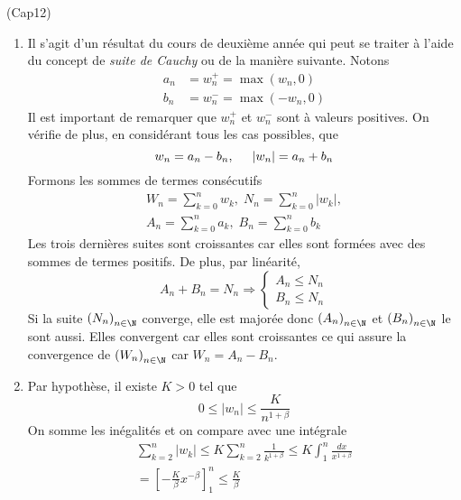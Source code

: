 \begin{tiny}(Cap12)\end{tiny}
\begin{enumerate}
 \item Il s'agit d'un résultat du cours de deuxième année qui peut se traiter à l'aide du concept de \emph{suite de Cauchy} ou de la manière suivante.\newline
Notons 
\begin{align*}
a_n &=w_n^+=\max(w_n,0) \\ b_n &=w_n^-=\max(-w_n,0) 
\end{align*}
Il est important de remarquer que $w_n^+$ et $w_n^-$ sont à valeurs positives. On vérifie de plus, en considérant tous les cas possibles, que 
\begin{displaymath}
 w_n = a_n - b_n,\hspace{0.5cm} |w_n| = a_n + b_n
\end{displaymath}
Formons les sommes de termes consécutifs
\begin{multline*}
 W_n = \sum_{k=0}^nw_k, \; N_n = \sum_{k=0}^n|w_k|, \\ A_n = \sum_{k=0}^na_k, \;B_n = \sum_{k=0}^nb_k
\end{multline*}
Les trois dernières suites sont croissantes car elles sont formées avec des sommes de termes positifs. De plus, par linéarité,
\begin{displaymath}
 A_n + B_n = N_n \Rightarrow \left\lbrace 
\begin{aligned}
 A_n \leq N_n \\ B_n\leq N_n
\end{aligned}
\right. 
\end{displaymath}
Si la suite $\left( N_n\right) _{n\in \N}$ converge, elle est majorée donc $\left( A_n\right) _{n\in \N}$ et $\left( B_n\right) _{n\in \N}$ le sont aussi. Elles convergent car elles sont croissantes ce qui assure la convergence de $\left( W_n\right) _{n\in \N}$ car $W_n =A_n - B_n$.
 \item Par hypothèse, il existe $K>0$ tel que 
\begin{displaymath}
 0\leq |w_n| \leq \frac{K}{n^{1+\beta}}
\end{displaymath}
On somme les inégalités et on compare avec une intégrale
\begin{multline*}
 \sum_{k=2}^n|w_k|\leq K \sum_{k=2}^n\frac{1}{k^{1+\beta}}\leq K\int_{1}^{n}\frac{dx}{x^{1+\beta}} \\
= \left[-\frac{K}{\beta}x^{-\beta} \right]_{1}^{n} \leq  \frac{K}{\beta}
\end{multline*}

\end{enumerate}
